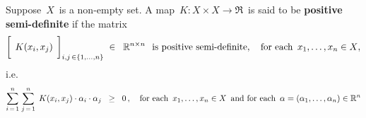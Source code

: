 
\vskip 0.5cm
\begin{definition}
\mbox{}
\vskip 0.1cm
\noindent
Suppose \,$X$\, is a non-empty set.
A map \,$K : X \times X \longrightarrow \Re$\, is said to be \textbf{positive semi-definite}
if the matrix 
\begin{equation*}
\left[\;\, \overset{{\color{white}-}}{K}(x_{i},x_{j}) \,\;\right]_{i,j\,\in\{1,\ldots,n\}}
\; \in \;\; \Re^{n \times n}
\;\;\,\textnormal{is positive semi-definite},
\quad
\textnormal{for each \,$x_{1},\ldots,x_{n} \in X$},
\end{equation*}
i.e.
\begin{equation*}
\overset{n}{\underset{i\,=\,1}{\sum}}\;
\overset{n}{\underset{j\,=\,1}{\sum}}\;\,
K(x_{i},x_{j}) \cdot \alpha_{i} \cdot \alpha_{j}
\;\; \geq \;\; 0\,,
\quad
\textnormal{for each \,$x_{1},\ldots,x_{n} \in X$\, and for each \,$\alpha = (\alpha_{1},\ldots,\alpha_{n})\in\Re^{n}$}
\end{equation*}
\end{definition}


